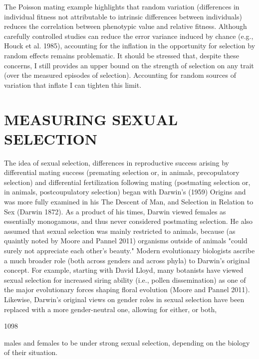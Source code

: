 \documentclass{article}
\begin{document}
The Poisson mating example highlights that random variation (differences in individual fitness not attributable to intrinsic differences between individuals) reduces the correlation between phenotypic value and relative fitness. Although carefully controlled studies can reduce the error variance induced by chance (e.g., Houck et al. 1985), accounting for the inflation in the opportunity for selection by random effects remains problematic. It should be stressed that, despite these concerns, I still provides an upper bound on the strength of selection on any trait (over the measured episodes of selection). Accounting for random sources of variation that inflate I can tighten this limit.

\section{MEASURING SEXUAL SELECTION}
The idea of sexual selection, differences in reproductive success arising by differential mating success (premating selection or, in animals, precopulatory selection) and differential fertilization following mating (postmating selection or, in animals, postcoupulatory selection) began with Darwin's (1959) Origins and was more fully examined in his The Descent of Man, and Selection in Relation to Sex (Darwin 1872). As a product of his times, Darwin viewed females as essentially monogamous, and thus never considered postmating selection. He also assumed that sexual selection was mainly restricted to animals, because (as quaintly noted by Moore and Pannel 2011) organisms outside of animals "could surely not appreciate each other's beauty." Modern evolutionary biologists ascribe a much broader role (both across genders and across phyla) to Darwin's original concept. For example, starting with David Lloyd, many botanists have viewed sexual selection for increased siring ability (i.e., pollen dissemination) as one of the major evolutionary forces shaping floral evolution (Moore and Pannel 2011). Likewise, Darwin's original views on gender roles in sexual selection have been replaced with a more gender-neutral one, allowing for either, or both,

1098

males and females to be under strong sexual selection, depending on the biology of their situation.
\end{document}
